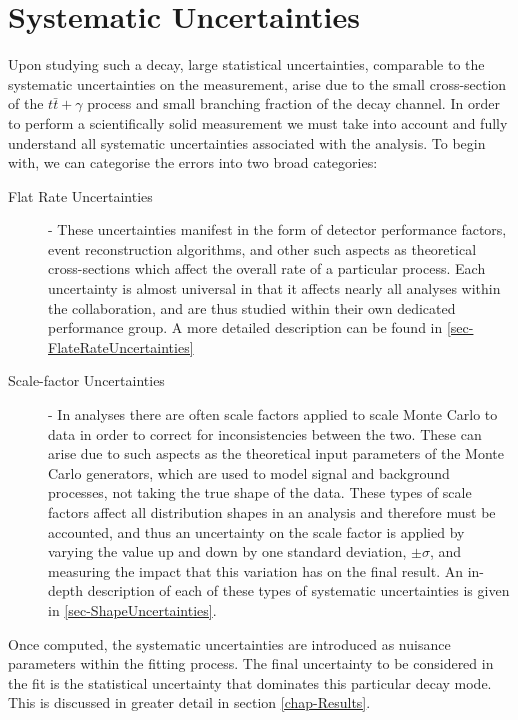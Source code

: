 \chapter{Systematic Uncertainties} \label{chap-SystematicUncertainties}

Upon studying such a decay, large statistical uncertainties, comparable to the systematic uncertainties on the measurement, arise due to the small cross-section of the $t\bar{t}+\gamma$ process and small branching fraction of the decay channel. In order to perform a scientifically solid measurement we must take into account and fully understand all systematic uncertainties associated with the analysis. To begin with, we can categorise the errors into two broad categories:

\begin{description}
	\item[Flat Rate Uncertainties] - These uncertainties manifest in the form of detector performance factors, event reconstruction algorithms, and other such aspects as theoretical cross-sections which affect the overall rate of a particular process. Each uncertainty is almost universal in that it affects nearly all analyses within the collaboration, and are thus studied within their own dedicated performance group. A more detailed description can be found in \ref{sec-FlateRateUncertainties}  
	\item[Scale-factor Uncertainties] - In analyses there are often scale factors applied to scale Monte Carlo to data in order to correct for inconsistencies between the two. These can arise due to such aspects as the theoretical input parameters of the Monte Carlo generators, which are used to model signal and background processes, not taking the true shape of the data. These types of scale factors affect all distribution shapes in an analysis and therefore must be accounted, and thus an uncertainty on the scale factor is applied by varying the value up and down by one standard deviation, $\pm \sigma$, and measuring the impact that this variation has on the final result. An in-depth description of each of these types of systematic uncertainties is given in \ref{sec-ShapeUncertainties}.
\end{description}

Once computed, the systematic uncertainties are introduced as nuisance parameters within the fitting process. The final uncertainty to be considered in the fit is the statistical uncertainty that dominates this particular decay mode. This is discussed in greater detail in section \ref{chap-Results}.

